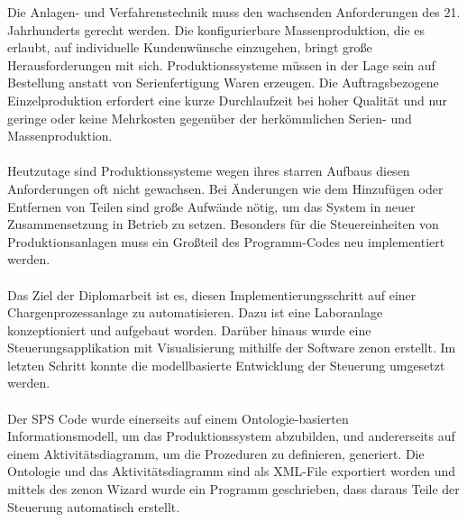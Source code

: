 Die Anlagen- und Verfahrenstechnik muss den wachsenden Anforderungen des 21. Jahrhunderts gerecht werden. Die konfigurierbare Massenproduktion, die es erlaubt, auf individuelle Kundenwünsche einzugehen, bringt große Herausforderungen mit sich. Produktionssysteme müssen in der Lage sein auf Bestellung anstatt von Serienfertigung Waren erzeugen. Die Auftragsbezogene Einzelproduktion erfordert eine kurze Durchlaufzeit bei hoher Qualität und nur geringe oder keine Mehrkosten gegenüber der herkömmlichen Serien- und Massenproduktion. \\\\
Heutzutage sind Produktionssysteme wegen ihres starren Aufbaus diesen Anforderungen oft nicht gewachsen. Bei Änderungen wie dem Hinzufügen oder Entfernen von Teilen sind große Aufwände nötig, um das System in neuer Zusammensetzung in Betrieb zu setzen. Besonders für die Steuereinheiten von Produktionsanlagen muss ein Großteil des Programm-Codes neu implementiert werden.\\\\
Das Ziel der Diplomarbeit ist es, diesen Implementierungsschritt auf einer Chargenprozessanlage zu automatisieren. Dazu ist eine Laboranlage konzeptioniert und aufgebaut worden. Darüber hinaus wurde eine Steuerungsapplikation mit Visualisierung mithilfe der Software zenon erstellt. Im letzten Schritt konnte die modellbasierte Entwicklung der Steuerung umgesetzt werden. 
\\\\
Der \ac{SPS} Code wurde einerseits auf einem Ontologie-basierten Informationsmodell, um das Produktionssystem abzubilden, und andererseits auf einem Aktivitätsdiagramm, um die Prozeduren zu definieren, generiert. Die Ontologie und das Aktivitätsdiagramm sind als \ac{XML}-File exportiert worden und mittels des zenon Wizard wurde ein Programm geschrieben, dass daraus Teile der Steuerung automatisch erstellt.\\\\
